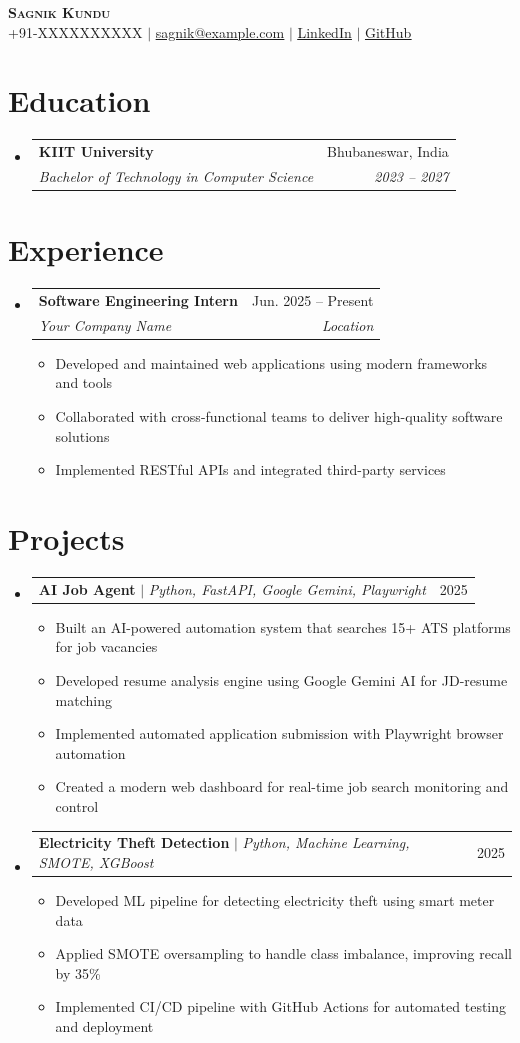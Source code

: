 \documentclass[letterpaper,11pt]{article}
\makeatletter
\newcommand{\resumeItem}[1]{
  \item\small{
    {#1 \vspace{-2pt}}
  }
}
\newcommand{\resumeSubheading}[4]{
  \vspace{-2pt}\item
    \begin{tabular*}{0.97\textwidth}[t]{l@{\extracolsep{\fill}}r}
      \textbf{#1} & #2 \\
      \textit{\small#3} & \textit{\small #4} \\
    \end{tabular*}\vspace{-7pt}
}
\newcommand{\resumeProjectHeading}[2]{
    \item
    \begin{tabular*}{0.97\textwidth}{l@{\extracolsep{\fill}}r}
      \small#1 & #2 \\
    \end{tabular*}\vspace{-7pt}
}
\newcommand{\resumeSubHeadingListStart}{\begin{itemize}[leftmargin=0.15in, label={}]}
\newcommand{\resumeSubHeadingListEnd}{\end{itemize}}
\newcommand{\resumeItemListStart}{\begin{itemize}}
\newcommand{\resumeItemListEnd}{\end{itemize}\vspace{-5pt}}
\makeatother
\begin{document}
\begin{center}
    \textbf{\Huge \scshape Sagnik Kundu} \\ \vspace{1pt}
    \small +91-XXXXXXXXXX $|$ \href{mailto:sagnik@example.com}{\underline{sagnik@example.com}} $|$
    \href{https://www.linkedin.com/in/sagnik-kundu-77a94b357}{\underline{LinkedIn}} $|$
    \href{https://github.com/sagnikkundu}{\underline{GitHub}}
\end{center}

\section{Education}
  \resumeSubHeadingListStart
    \resumeSubheading
      {KIIT University}{Bhubaneswar, India}
      {Bachelor of Technology in Computer Science}{2023 -- 2027}
  \resumeSubHeadingListEnd

\section{Experience}
  \resumeSubHeadingListStart
    \resumeSubheading
      {Software Engineering Intern}{Jun. 2025 -- Present}
      {Your Company Name}{Location}
      \resumeItemListStart
        \resumeItem{Developed and maintained web applications using modern frameworks and tools}
        \resumeItem{Collaborated with cross-functional teams to deliver high-quality software solutions}
        \resumeItem{Implemented RESTful APIs and integrated third-party services}
      \resumeItemListEnd
  \resumeSubHeadingListEnd

\section{Projects}
    \resumeSubHeadingListStart
      \resumeProjectHeading
          {\textbf{AI Job Agent} $|$ \emph{Python, FastAPI, Google Gemini, Playwright}}{2025}
          \resumeItemListStart
            \resumeItem{Built an AI-powered automation system that searches 15+ ATS platforms for job vacancies}
            \resumeItem{Developed resume analysis engine using Google Gemini AI for JD-resume matching}
            \resumeItem{Implemented automated application submission with Playwright browser automation}
            \resumeItem{Created a modern web dashboard for real-time job search monitoring and control}
          \resumeItemListEnd
      \resumeProjectHeading
          {\textbf{Electricity Theft Detection} $|$ \emph{Python, Machine Learning, SMOTE, XGBoost}}{2025}
          \resumeItemListStart
            \resumeItem{Developed ML pipeline for detecting electricity theft using smart meter data}
            \resumeItem{Applied SMOTE oversampling to handle class imbalance, improving recall by 35\%}
            \resumeItem{Implemented CI/CD pipeline with GitHub Actions for automated testing and deployment}
          \resumeItemListEnd
    \resumeSubHeadingListEnd
\end{document}
